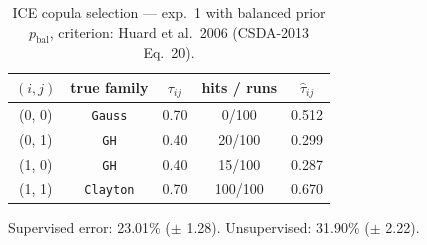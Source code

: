 \begin{table}[htbp]
  \centering
  \caption{ICE copula selection — exp.\ 1 with balanced prior $p_{\text{bal}}$, criterion: Huard et al.\ 2006 (CSDA-2013 Eq.\ 20).}
  \label{tab:exp3-exp1_bal_p__huard}
  \begin{tabular}{ccccc}
    \toprule
    $(i, j)$ & true family & $\tau_{ij}$ & hits / runs & $\hat\tau_{ij}$ \\
    \midrule
    (0, 0) & \texttt{Gauss} & 0.70 & 0/100 & 0.512 \\
    (0, 1) & \texttt{GH} & 0.40 & 20/100 & 0.299 \\
    (1, 0) & \texttt{GH} & 0.40 & 15/100 & 0.287 \\
    (1, 1) & \texttt{Clayton} & 0.70 & 100/100 & 0.670 \\
    \bottomrule
  \end{tabular}
  \par\smallskip Supervised error: 23.01\% ($\pm$ 1.28). Unsupervised: 31.90\% ($\pm$ 2.22).
\end{table}
